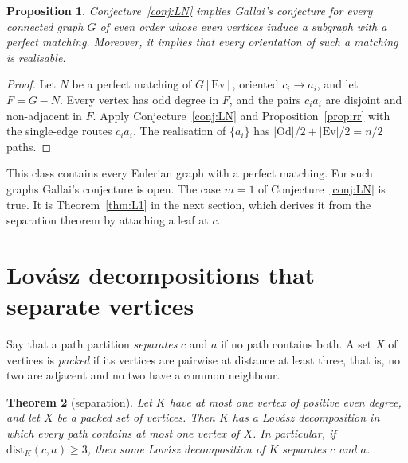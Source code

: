 \documentclass[11pt]{amsart}
\newtheorem{theorem}{Theorem}[section]
\newtheorem{proposition}[theorem]{Proposition}
\theoremstyle{definition}
\newcommand{\Ev}{\mathrm{Ev}}
\newcommand{\Od}{\mathrm{Od}}
\begin{document}
\begin{proposition}\label{prop:LN}
Conjecture~\ref{conj:LN} implies Gallai's conjecture for every connected graph $G$ of even order whose
even vertices induce a subgraph with a perfect matching. Moreover, it implies that every orientation of
such a matching is realisable.
\end{proposition}

\begin{proof}
Let $N$ be a perfect matching of $G[\Ev]$, oriented $c_i\to a_i$, and let $F=G-N$. Every vertex has odd
degree in $F$, and the pairs $c_ia_i$ are disjoint and non-adjacent in $F$. Apply Conjecture~\ref{conj:LN}
and Proposition~\ref{prop:rr} with the single-edge routes $c_ia_i$. The realisation of $\{a_i\}$ has
$|\Od|/2+|\Ev|/2=n/2$ paths.
\end{proof}

This class contains every Eulerian graph with a perfect matching. For such graphs Gallai's conjecture is
open. The case $m=1$ of Conjecture~\ref{conj:LN} is true. It is Theorem~\ref{thm:L1} in the next
section, which derives it from the separation theorem by attaching a leaf at $c$.

\section{Lov\'asz decompositions that separate vertices}\label{sec:sep}

Say that a path partition \emph{separates} $c$ and $a$ if no path contains both. A set $X$ of
vertices is \emph{packed} if its vertices are pairwise at distance at least three, that is, no two are
adjacent and no two have a common neighbour.

\begin{theorem}[separation]\label{thm:sep}
Let $K$ have at most one vertex of positive even degree, and let $X$ be a packed set of vertices. Then
$K$ has a Lov\'asz decomposition in which every path contains at most one vertex of $X$. In particular,
if $\mathrm{dist}_K(c,a)\ge3$, then some Lov\'asz decomposition of $K$ separates $c$ and $a$.
\end{theorem}
\end{document}
